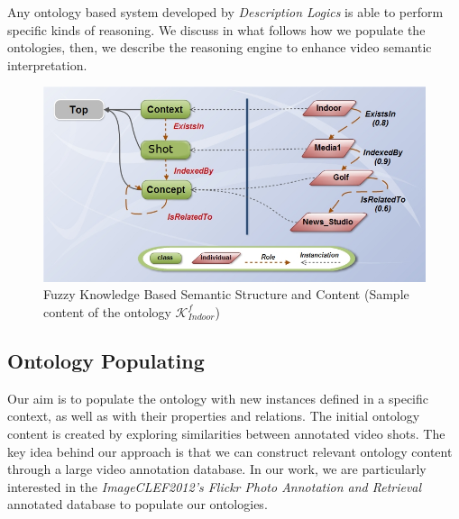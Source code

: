 		Any ontology based system developed by \emph{Description Logics} is able
		to perform specific kinds of reasoning. We discuss in what follows how we populate the ontologies,
		then, we describe the reasoning engine to enhance video semantic interpretation.
         
		\begin{figure}[ht!]	
			\centering
			\includegraphics[width=\textwidth]{graphics/OntologyStructure_2}
			\caption{Fuzzy Knowledge Based Semantic Structure and Content 
			(Sample content of the ontology $\mathcal{K}^{f}_{Indoor}$) }
			\label{fig:ontology_structure}
		\end{figure}

		\subsection{Ontology Populating}
		Our aim is to populate the ontology with new instances defined in a specific context, 
		as well as with their properties and relations. The initial ontology content is created by exploring 
		similarities between annotated video shots. The key idea behind our approach is that we can construct 
		relevant ontology content through a large video annotation database. 	
		In our work, we are particularly interested in the 
		\emph{ImageCLEF2012's Flickr Photo Annotation and Retrieval} \cite{Thomee2012} annotated 
		database to populate our ontologies. 


